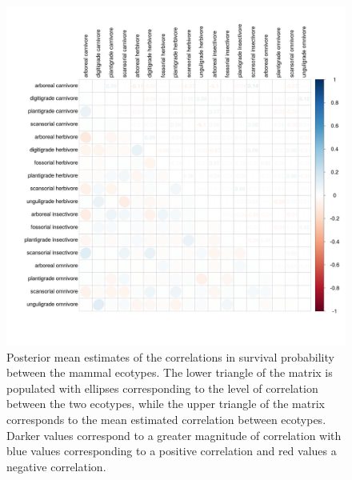\documentclass[12pt,letterpaper]{article}
\begin{document}
\begin{figure}[ht]
  \centering
  \includegraphics[width=\textwidth,height=\textheight,keepaspectratio=true]{figure/survival_correlation}
  \caption[Estimated correlations in survival probability between ecotypes]{Posterior mean estimates of the correlations in survival probability between the mammal ecotypes. The lower triangle of the matrix is populated with ellipses corresponding to the level of correlation between the two ecotypes, while the upper triangle of the matrix corresponds to the mean estimated correlation between ecotypes. Darker values correspond to a greater magnitude of correlation with blue values corresponding to a positive correlation and red values a negative correlation.}
  \label{fig:survival_corr}
\end{figure}
\end{document}

